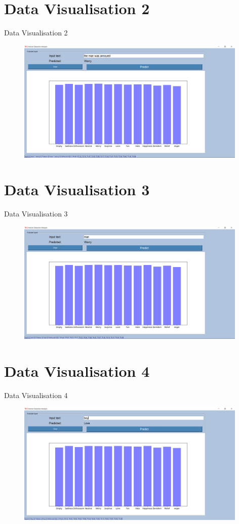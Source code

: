 \documentclass{beamer}
\begin{document}
\section{Data Visualisation 2}
\begin{frame}{Data Visualisation 2}
\begin{figure}[H]
\centering
\includegraphics[width=110mm]{DV4.png}
\end{figure}
\end{frame}

\section{Data Visualisation 3}
\begin{frame}{Data Visualisation 3}
\begin{figure}[H]
\centering
\includegraphics[width=110mm]{DV1.png}
\end{figure}
\end{frame}

\section{Data Visualisation 4}
\begin{frame}{Data Visualisation 4}
\begin{figure}[H]
\centering
\includegraphics[width=110mm]{DV2.png}
\end{figure}
\end{frame}
\end{document}

